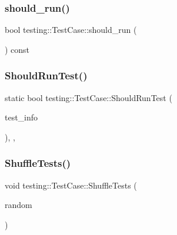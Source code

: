 \mbox{\label{classtesting_1_1_test_case_a843d6cd43f3e587bfa8681990b9d59df}} 
\subsubsection{\texorpdfstring{should\_run()}{should\_run()}}
{\footnotesize\ttfamily bool testing\+::\+Test\+Case\+::should\+\_\+run (\begin{DoxyParamCaption}{ }\end{DoxyParamCaption}) const\hspace{0.3cm}{\ttfamily [inline]}}

\mbox{\label{classtesting_1_1_test_case_a75eb139557c43362f94916cfd6762c94}} 
\subsubsection{\texorpdfstring{ShouldRunTest()}{ShouldRunTest()}}
{\footnotesize\ttfamily static bool testing\+::\+Test\+Case\+::\+Should\+Run\+Test (\begin{DoxyParamCaption}\item[{const \mbox{\hyperlink{classtesting_1_1_test_info}{Test\+Info}} $\ast$}]{test\+\_\+info }\end{DoxyParamCaption})\hspace{0.3cm}{\ttfamily [inline]}, {\ttfamily [static]}, {\ttfamily [private]}}

\mbox{\label{classtesting_1_1_test_case_ac26160e2aeb3d8c86b611843c5abdb29}} 
\subsubsection{\texorpdfstring{ShuffleTests()}{ShuffleTests()}}
{\footnotesize\ttfamily void testing\+::\+Test\+Case\+::\+Shuffle\+Tests (\begin{DoxyParamCaption}\item[{\mbox{\hyperlink{classtesting_1_1internal_1_1_random}{internal\+::\+Random}} $\ast$}]{random }\end{DoxyParamCaption})\hspace{0.3cm}{\ttfamily [private]}}

